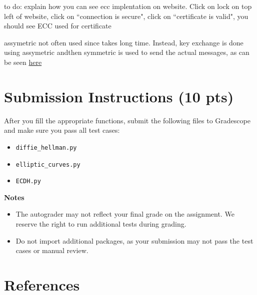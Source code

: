 \documentclass{article}
\begin{document}
    to do: explain how you can see ecc implentation on website. Click on lock on top left of website, click on ``connection is secure", click on ``certificate is valid", you should see ECC used for certificate

    
    assymetric not often used since takes long time. Instead, key exchange is done using assymetric andthen symmetric is used to send the actual messages, as can be seen \href{https://github.com/nakov/Practical-Cryptography-for-Developers-Book/blob/master/asymmetric-key-ciphers/ecc-encryption-decryption.md}{here}


\section*{Submission Instructions (10 pts)}
    After you fill the appropriate functions, submit the following files to Gradescope and make sure you pass all test cases:
    \begin{itemize}
        \item \lstinline{diffie_hellman.py}
        \item \lstinline{elliptic_curves.py}
        \item \lstinline{ECDH.py}
    \end{itemize}

    \vspace{3mm}
    \textbf{Notes}
    \begin{itemize}
        \item The autograder may not reflect your final grade on the assignment. We reserve the right to run additional tests during grading.
        \item Do not import additional packages, as your submission may not pass the test cases or manual review.
    \end{itemize}

    

\section*{References}
\end{document}
